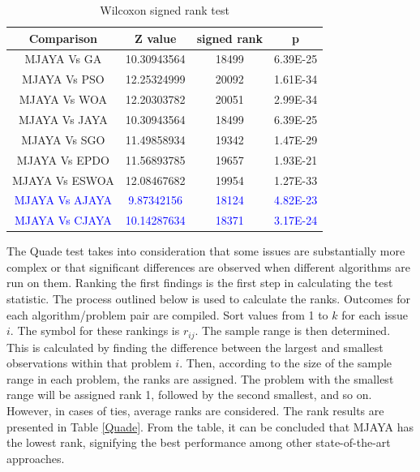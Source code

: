\documentclass[3p,twocolumn]{elsarticle}
\theoremstyle{thmstyleone}%
\theoremstyle{thmstyletwo}%
\theoremstyle{thmstylethree}%
\begin{document}
\begin{table}[]
	\caption{Wilcoxon signed rank test}
	\label{wilcoxon}
	\centering
	\begin{tabular}{@{}cccc@{}}
		\toprule
		\textbf{Comparison} & \textbf{Z value} & \textbf{signed rank} & \textbf{p} \\ \midrule
		MJAYA Vs GA         & 10.30943564      & 18499                & 6.39E-25   \\
		MJAYA Vs PSO        & 12.25324999      & 20092                & 1.61E-34   \\
		MJAYA Vs WOA        & 12.20303782      & 20051                & 2.99E-34   \\
		MJAYA Vs JAYA       & 10.30943564      & 18499                & 6.39E-25   \\
        MJAYA Vs SGO        & 11.49858934      & 19342                & 1.47E-29   \\
        MJAYA Vs EPDO       & 11.56893785      & 19657                & 1.93E-21   \\
		MJAYA Vs ESWOA      & 12.08467682      & 19954                & 1.27E-33   \\
        \textcolor{blue}{MJAYA Vs AJAYA} & \textcolor{blue}{9.87342156} & \textcolor{blue}{18124} & \textcolor{blue}{4.82E-23} \\
        \textcolor{blue}{MJAYA Vs CJAYA} & \textcolor{blue}{10.14287634} & \textcolor{blue}{18371} & \textcolor{blue}{3.17E-24} \\ \bottomrule
	\end{tabular}
\end{table}


The Quade test \cite{quade1979using} takes into consideration that some issues are substantially more complex or that significant differences are observed when different algorithms are run on them. Ranking the first findings is the first step in calculating the test statistic. The process outlined below is used to calculate the ranks. Outcomes for each algorithm/problem pair are compiled. Sort values from 1 to $k$ for each issue $i$. The symbol for these rankings is $r_{ij}$. The sample range is then determined. This is calculated by finding the difference between
the largest and smallest observations within that problem $i$. Then, according to the size of the sample range in each problem, the ranks are assigned. The
problem with the smallest range will be assigned rank 1, followed by the second smallest, and so on. However, in cases of ties, average ranks are considered. The rank results are presented in Table \ref{Quade}. From the table, it can be concluded that MJAYA has the lowest rank, signifying the best performance among other state-of-the-art approaches.
\end{document}
